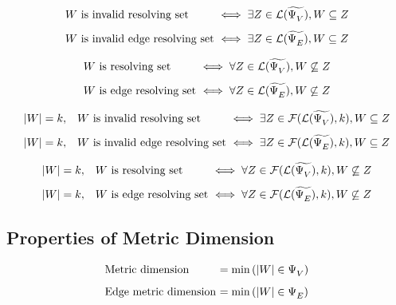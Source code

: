 \begin{theorem}
	\[\begin{array}{l@{\ }l}
		W \text{ is invalid resolving set} &\iff \exists Z \in \Lcal(\nonresolving{V}), W \subseteq Z \\ [8pt]
		W \text{ is invalid edge resolving set} &\iff \exists Z \in \Lcal(\nonresolving{E}), W \subseteq Z
	\end{array}\]
\end{theorem}

\begin{corollary}
	\[\begin{array}{l@{\ }l}
		W \text{ is resolving set} &\iff \forall Z \in \Lcal(\nonresolving{V}), W \not\subseteq Z \\ [8pt]
		W \text{ is edge resolving set} &\iff \forall Z \in \Lcal(\nonresolving{E}), W \not\subseteq Z
	\end{array}\]
\end{corollary}

\begin{theorem}
	\label{thm:resolving-set-test}
	\[\begin{array}{ll@{\ }l}
		|W| = k, & W \text{ is invalid resolving set} &\iff \exists Z \in \Fcal(\Lcal(\nonresolving{V}),k), W \subseteq Z \\ [8pt]
		|W| = k, & W \text{ is invalid edge resolving set} &\iff \exists Z \in \Fcal(\Lcal(\nonresolving{E}),k), W \subseteq Z
	\end{array}\]
\end{theorem}

\begin{corollary}
	\[\begin{array}{ll@{\ }l}
		|W| = k, & W \text{ is resolving set} &\iff \forall Z \in \Fcal(\Lcal(\nonresolving{V}),k), W \not\subseteq Z \\ [8pt]
		|W| = k, & W \text{ is edge resolving set} &\iff \forall Z \in \Fcal(\Lcal(\nonresolving{E}),k), W \not\subseteq Z
	\end{array}\]
\end{corollary}

\cleardoublepage
\subsection{Properties of Metric Dimension}

\begin{definition}
	\[\begin{array}{l@{\ }l}
		\text{Metric dimension} &= \mathrm{min}\left(|W| \in \resolving{V}\right) \\ [8pt]
		\text{Edge metric dimension} &= \mathrm{min}\left(|W| \in \resolving{E}\right)
	\end{array}\]
\end{definition}


